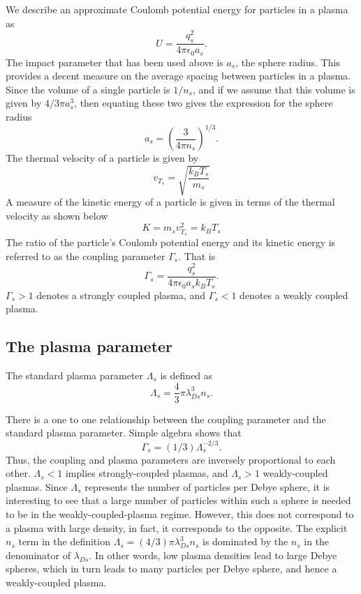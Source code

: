 \documentclass[a4paper,11pt]{report}
\begin{document}
We describe an approximate Coulomb potential energy for particles in a plasma as
\begin{equation}
    U =  \frac{q_s^2}{4 \pi \epsilon_0 a_s}.
\end{equation}
The impact parameter that has been used above is $a_s$, the sphere radius. This provides a decent measure on the average spacing between particles in a plasma. Since the volume of a single particle is $1/n_s$, and if we assume that this volume is given by $4/3 \pi a_s^3$, then equating these two gives the expression for the sphere radius
\begin{equation}
    a_s = \left ( \frac{3}{4 \pi n_s} \right )^{1/3}.
\end{equation}
The thermal velocity of a particle is given by
\begin{equation}
    v_{T_s} = \sqrt{\frac{k_B T_s}{m_s}}
\end{equation}
A measure of the kinetic energy of a particle is given in terms of the thermal velocity as shown below
\begin{equation}
    K = m_s v_{T_s}^2 = k_B T_s
\end{equation}
The ratio of the particle's Coulomb potential energy and its kinetic energy is referred to as the coupling parameter $\Gamma_s$. That is 
\begin{equation}
    \Gamma_s = \frac{q_s^2}{4 \pi \epsilon_0 a_s k_B T_s}.
\end{equation}
$\Gamma_s > 1$ denotes a strongly coupled plasma, and $\Gamma_s < 1$ denotes a weakly coupled plasma. 

\subsection{The plasma parameter}
The standard plasma parameter $\Lambda_s$ is defined as
\begin{equation}
    \Lambda_s = \frac{4}{3} \pi \lambda_{Ds}^3 n_s.
\end{equation}

There is a one to one relationship between the coupling parameter and the standard plasma parameter. Simple algebra shows that 
\begin{equation}
    \Gamma_s = (1/3) \Lambda_s^{-2/3}.
\end{equation}
Thus, the coupling and plasma parameters are inversely proportional to each other. $\Lambda_s < 1$ implies strongly-coupled plasmas, and $\Lambda_s > 1$ weakly-coupled plasmas. Since $\Lambda_s$ represents the number of particles per Debye sphere, it is interesting to see that a large number of particles within such a sphere is needed to be in the weakly-coupled-plasma regime. However, this does not correspond to a plasma with large density, in fact, it corresponds to the opposite. The explicit $n_s$ term in the definition $\Lambda_s = (4/3) \pi \lambda^3_{Ds} n_s$ is dominated by the $n_s$ in the denominator of $\lambda_{Ds}$. In other words, low plasma densities lead to large Debye spheres, which in turn leads to many particles per Debye sphere, and hence a weakly-coupled plasma.
\end{document}
